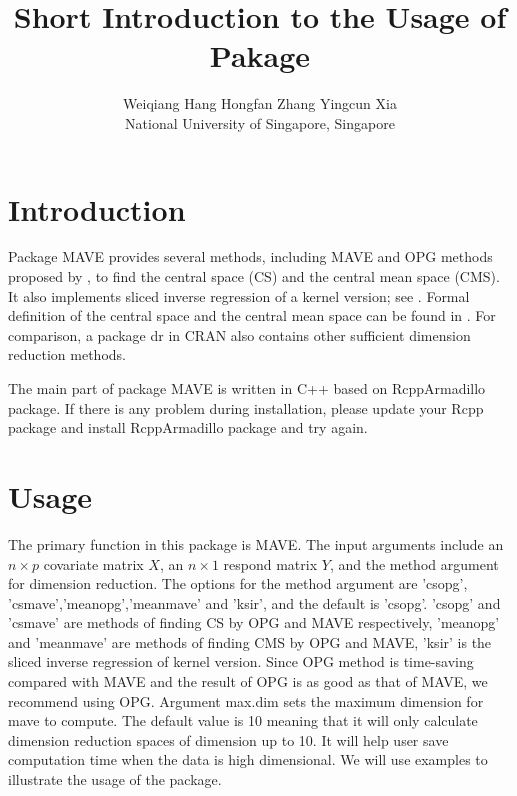 \documentclass{article}
\title{Short Introduction to the Usage of Pakage \sffamily{MAVE}}
\author{Weiqiang Hang \quad Hongfan Zhang \quad Yingcun Xia
	\\
	National University of Singapore, Singapore
}
\newcommand{\code}[1]{\normalfont\ttfamily\hyphenchar\font=-1 #1}
\begin{document}

\maketitle

\section{Introduction}
Package {\sffamily MAVE} provides several methods, including MAVE and OPG methods proposed by \cite{Xia2002,Xia2007,Xia2008},  to find the central space (CS) and the central mean space (CMS). It also implements sliced inverse regression of a kernel version; see \cite{Li1991,Xia2002}. Formal definition of the central space and the central mean space can be found in \cite{Cook1998,Cook2002}. For comparison, a package {\sffamily dr} in CRAN also contains other sufficient dimension reduction methods\cite{dr}.

The main part of package {\sffamily MAVE} is written in C++ based on {\sffamily RcppArmadillo} package. If there is any problem during installation, please update your Rcpp package and install RcppArmadillo package and try again.

\section{Usage}
The primary function in this package is {\sffamily MAVE}. The input arguments include an $n \times p$ covariate matrix $X$, an $n\times 1$ respond matrix $Y$, and the method argument for dimension reduction. The options for the method argument are {\sffamily 'csopg', 'csmave','meanopg','meanmave'} and {\sffamily 'ksir'}, and the default is {\sffamily 'csopg'}. {\sffamily 'csopg'} and {\sffamily 'csmave'} are methods of finding CS by OPG and MAVE respectively, {\sffamily 'meanopg'} and {\sffamily 'meanmave'} are methods of finding CMS by OPG and MAVE, {\sffamily 'ksir'} is the sliced inverse regression of kernel version. Since OPG method is time-saving compared with MAVE and the result of OPG is as good as that of MAVE, we recommend using OPG. Argument \code{max.dim} sets the maximum dimension for \code{mave} to compute. The default value is 10 meaning that it will only calculate dimension reduction spaces of dimension up to 10. It will help user save computation time when the data is high dimensional. We will use examples to illustrate the usage of the package.
\end{document}
